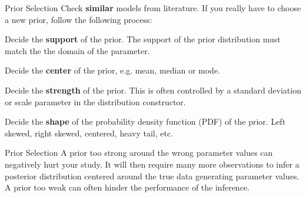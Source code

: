 \begin{frame}{Prior Selection}
  \vfill
  Check \textbf{similar} models from literature. If you really have to choose a new prior, follow the following process:
  \vfill
  \begin{vfilleditems}
	 \item Decide the \textbf{support} of the prior. The support of the prior distribution must match the the domain of the parameter.
	 \item Decide the \textbf{center} of the prior, e.g. mean, median or mode.
	 \item Decide the \textbf{strength} of the prior. This is often controlled by a standard deviation or scale parameter in the distribution constructor.
	 \item Decide the \textbf{shape} of the probability density function (PDF) of the prior. Left skewed, right skewed, centered, heavy tail, etc.
  \end{vfilleditems}
\end{frame}

\begin{frame}{Prior Selection}
  A prior too strong around the wrong parameter values can negatively hurt your study.
  \vfill
  It will then require many more observations to infer a posterior distribution centered around the true data generating parameter values.
  \vfill
  A prior too weak can often hinder the performance of the inference.
\end{frame}


